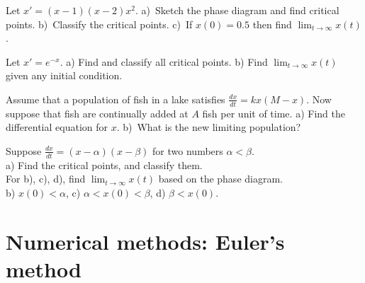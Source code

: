 \documentclass[12pt]{book}
\begin{document}
\setcounter{exercise}{100}

\begin{exercise}
Let $x'=(x-1)(x-2)x^2$.  a)~Sketch the phase diagram and find critical
points.  b)~Classify the critical points.  c)~If $x(0)=0.5$ then
find $\displaystyle \lim_{t\to\infty} x(t)$.
\end{exercise}

\begin{exercise}
Let $x'=e^{-x}$. a) Find and classify all critical points.  b)
Find $\displaystyle \lim_{t\to\infty} x(t)$ given any 
initial condition.
\end{exercise}

\begin{exercise}
Assume that a population of fish in a lake satisfies
$\frac{dx}{dt} = kx(M-x)$.  Now suppose that fish are continually added
at $A$ fish per unit of time.  a) Find the differential equation for $x$.
b)~What is the new limiting population?
\end{exercise}

\begin{exercise}
Suppose $\frac{dx}{dt} = (x-\alpha)(x-\beta)$ for two numbers $\alpha <
\beta$.\\
a) Find the critical points, and classify them.
\\
For b), c), d), find $\displaystyle \lim_{t\to\infty} x(t)$ based on
the phase diagram.\\
b) $x(0) < \alpha$, \qquad
c) $\alpha < x(0) < \beta$, \qquad
d) $\beta < x(0)$.
\end{exercise}


\sectionnewpage
\section{Numerical methods: Euler's method} \label{numer:section}
\end{document}
